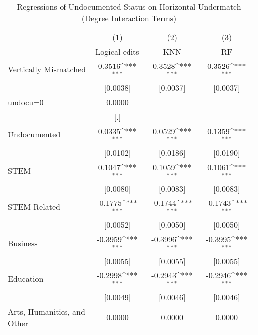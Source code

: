 \begin{table}[htbp]\centering
\def\sym#1{\ifmmode^{#1}\else\(^{#1}\)\fi}
\caption{Regressions of Undocumented Status on Horizontal Undermatch (Degree Interaction Terms)}
\begin{tabular}{l*{3}{c}}
\toprule
                    &\multicolumn{1}{c}{(1)}         &\multicolumn{1}{c}{(2)}         &\multicolumn{1}{c}{(3)}         \\
                    &Logical edits         &         KNN         &          RF         \\
\midrule
Vertically Mismatched&      0.3516\sym{***}&      0.3528\sym{***}&      0.3526\sym{***}\\
                    &    [0.0038]         &    [0.0037]         &    [0.0037]         \\
\addlinespace
undocu=0            &      0.0000         &                     &                     \\
                    &         [.]         &                     &                     \\
\addlinespace
Undocumented        &      0.0335\sym{***}&      0.0529\sym{***}&      0.1359\sym{***}\\
                    &    [0.0102]         &    [0.0186]         &    [0.0190]         \\
\addlinespace
STEM                &      0.1047\sym{***}&      0.1059\sym{***}&      0.1061\sym{***}\\
                    &    [0.0080]         &    [0.0083]         &    [0.0083]         \\
\addlinespace
STEM Related        &     -0.1775\sym{***}&     -0.1744\sym{***}&     -0.1743\sym{***}\\
                    &    [0.0052]         &    [0.0050]         &    [0.0050]         \\
\addlinespace
Business            &     -0.3959\sym{***}&     -0.3996\sym{***}&     -0.3995\sym{***}\\
                    &    [0.0055]         &    [0.0055]         &    [0.0055]         \\
\addlinespace
Education           &     -0.2998\sym{***}&     -0.2943\sym{***}&     -0.2946\sym{***}\\
                    &    [0.0049]         &    [0.0046]         &    [0.0046]         \\
\addlinespace
Arts, Humanities, and Other&      0.0000         &      0.0000         &      0.0000         \\

\end{tabular}
\end{table}
